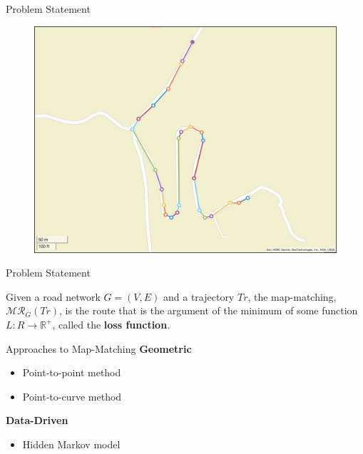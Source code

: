 \documentclass[aspectratio=169, bigfiles]{beamer}
\begin{document}
\begin{frame}{Problem Statement}
\begin{figure}
    \centering
    \includegraphics[scale =.405]{route9.png}
\end{figure}
\end{frame}


\begin{frame}{Problem Statement}

\begin{definition}
Given a road network $G=(V, E)$ and a trajectory
$Tr$, the map-matching, $\mathcal{MR}_G(Tr)$, is the route that is the argument of the minimum of some function $L:R\rightarrow \mathbb{R}^+$, called the \textbf{loss function}. 
\end{definition}

\end{frame}


\begin{frame}{Approaches to Map-Matching}
\textbf{Geometric}
\begin{itemize} 
    \item Point-to-point method
    \item Point-to-curve method
\end{itemize}
\vspace{.5cm}
\textbf{Data-Driven}
\begin{itemize} 
    \item Hidden Markov model
\end{itemize}
\end{frame}
\end{document}
